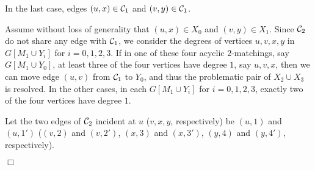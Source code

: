 \documentclass[11pt,twoside]{article}\usepackage{amssymb,latexsym,graphicx,hyperref}\usepackage{epstopdf}
\newenvironment{proof}{{\sc Proof. }}{\hfill$\Box$\vspace{0.2in}}
\begin{document}
\begin{proof}
In the last case, edges $(u, x) \in {\cal C}_1$ and $(v, y) \in {\cal C}_1$.

Assume without loss of generality that $(u, x) \in X_0$ and $(v, y) \in X_1$.
Since ${\cal C}_2$ do not share any edge with ${\cal C}_1$, we consider the degrees of vertices $u, v, x, y$ in $G[M_1 \cup Y_i]$ for $i = 0, 1, 2, 3$.
If in one of these four acyclic $2$-matchings, say $G[M_1 \cup Y_0]$, at least three of the four vertices have degree $1$, say $u, v, x$,
then we can move edge $(u, v)$ from ${\cal C}_1$ to $Y_0$, and thus the problematic pair of $X_2 \cup X_3$ is resolved.
In the other cases, in each $G[M_1 \cup Y_i]$ for $i = 0, 1, 2, 3$, exactly two of the four vertices have degree $1$.

Let the two edges of ${\cal C}_2$ incident at $u$ ($v, x, y$, respectively) be $(u, 1)$ and $(u, 1')$ ($(v, 2)$ and $(v, 2')$,
$(x, 3)$ and $(x, 3')$, $(y, 4)$ and $(y, 4')$, respectively).


\end{proof}
\end{document}
